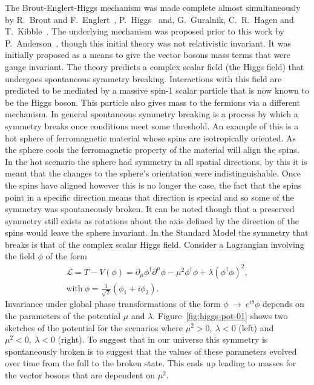 The Brout-Englert-Higgs mechanism was made complete almost simultaneously by
R.~Brout and F.~Englert~\cite{Brout-Englert}, P.~Higgs~\cite{Higgs:1964} and,
G.~Guralnik, C.~R.~Hagen and T.~Kibble~\cite{Kibble}. The underlying mechanism
was proposed prior to this work by P.~Anderson~\cite{Anderson}, though this
initial theory was not relativistic invariant. It was initially proposed as a
means to give the vector bosons mass terms that were gauge invariant. The theory
predicts a complex scalar field (the Higgs field) that undergoes spontaneous
symmetry breaking. Interactions with this field are predicted to be mediated by
a massive spin-1 scalar particle that is now known to be the Higgs boson. This
particle also gives mass to the fermions via a different mechanism.  In general
spontaneous symmetry breaking is a process by which a symmetry breaks once
conditions meet some threshold. An example of this is a hot sphere of
ferromagnetic material whose spins are isotropically oriented. As the sphere
cools the ferromagnetic property of the material will align the spins. In the
hot scenario the sphere had symmetry in all spatial directions, by this it is
meant that the changes to the sphere's orientation were indistinguishable. Once
the spins have aligned however this is no longer the case, the fact that the
spins point in a specific direction means that direction is special and so some
of the symmetry was spontaneously broken. It can be noted though that a
preserved symmetry still exists as rotations about the axis defined by the
direction of the spins would leave the sphere invariant.  In the Standard Model
the symmetry that breaks is that of the complex scalar Higgs field. Consider a
Lagrangian involving the field $\phi$ of the form
\begin{gather}
  \mathcal{L} = T - V ( \phi ) = \partial_{\mu} \phi^{\dagger} \partial^{\mu}
  \phi - \mu^{2}   \phi^{\dagger} \phi + \lambda {( \phi^{\dagger} \phi)}^{2},
  \\   \text{with}~\phi =\frac{1}{\sqrt{2}}(\phi_{1} + i\phi_{2}).
\end{gather}
Invariance under global phase transformations of the form
$\phi~\rightarrow~e^{i\theta}\phi$ depends on the parameters of the potential
$\mu$ and $\lambda$. Figure~\ref{fig:higgs-pot-01} shows two sketches of the
potential for the scenarios where $\mu^{2} > 0,~\lambda < 0$ (left) and $\mu^{2}
< 0,~\lambda < 0$ (right).  To suggest that
in our universe this symmetry is spontaneously broken is to suggest that the
values of these parameters evolved over time from the full to the broken state.
This ends up leading to masses for the vector bosons that are dependent on
$\mu^2$.

